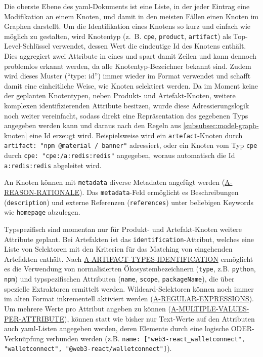 Die oberste Ebene des \acrshort{yaml}-Dokuments ist eine Liste, in der jeder Eintrag eine Modifikation an einem Knoten, und damit in den meisten Fällen einen Knoten im Graphen darstellt.
Um die Identifikation eines Knotens so kurz und einfach wie möglich zu gestalten, wird Knotentyp (z.\ B. \texttt{cpe}, \texttt{product}, \texttt{artifact}) als Top-Level-Schlüssel verwendet, dessen Wert die eindeutige Id des Knotens enthält.
Dies aggregiert zwei Attribute in eines und spart damit Zeilen und kann dennoch problemlos erkannt werden, da alle Knotentyp-Bezeichner bekannt sind.
Zudem wird dieses Muster (\enquote{type: id}) immer wieder im Format verwendet und schafft damit eine einheitliche Weise, wie Knoten selektiert werden.
Da im Moment keine der geplanten Knotentypen, neben Produkt- und Artefakt-Knoten, weitere komplexen identifizierenden Attribute besitzen, wurde diese Adressierungslogik noch weiter vereinfacht, sodass direkt eine Repräsentation des gegebenen Typs angegeben werden kann und daraus nach den Regeln aus \autoref{subsubsec:model-graph-knoten} eine Id erzeugt wird.
Beispielsweise wird ein \texttt{artefact}-Knoten durch \texttt{artifact: "npm @material / banner"} adressiert, oder ein Knoten vom Typ \texttt{cpe} durch \texttt{cpe: "cpe:/a:redis:redis"} angegeben, woraus automatisch die Id \texttt{a:redis:redis} abgeleitet wird.

An Knoten können mit \texttt{metadata} diverse Metadaten angefügt werden (\hyperref[subsec:req-reason-format]{A-REASON-RATIONALE}).
Das \texttt{metadata}-Feld ermöglicht es Beschreibungen (\texttt{description}) und externe Referenzen (\texttt{references}) unter beliebigen Keywords wie \texttt{homepage} abzulegen.

Typspezifisch sind momentan nur für Produkt- und Artefakt-Knoten weitere Attribute geplant.
Bei Artefakten ist das \texttt{identification}-Attribut, welches eine Liste von Selektoren mit den Kriterien für das Matching von eingehenden Artefakten enthält.
Nach \hyperref[subsec:req-type-specific-matching]{A-ARTIFACT-TYPES-IDENTIFICATION} ermöglicht es die Verwendung von normalisierten Ökosystembezeichnern (\texttt{type}, z.B. \texttt{python}, \texttt{npm}) und typspezifischen Attributen (\texttt{name}, \texttt{scope}, \texttt{packageName}), die über spezielle Extraktoren ermittelt werden.
Wildcard-Selektoren können noch immer im alten Format inkrementell aktiviert werden (\hyperref[subsec:req-regex-support]{A-REGULAR-EXPRESSIONS}).
Um mehrere Werte pro Attribut angeben zu können (\hyperref[subsec:req-multiple-attribute-values]{A-MULTIPLE-VALUES-PER-ATTRIBUTE}), können statt wie bisher nur Text-Werte auf den Attributen auch \acrshort{yaml}-Listen angegeben werden, deren Elemente durch eine logische ODER-Verknüpfung verbunden werden (z.B. \texttt{name: ["web3-react\_walletconnect", "walletconnect", "@web3-react/walletconnect"]}).

